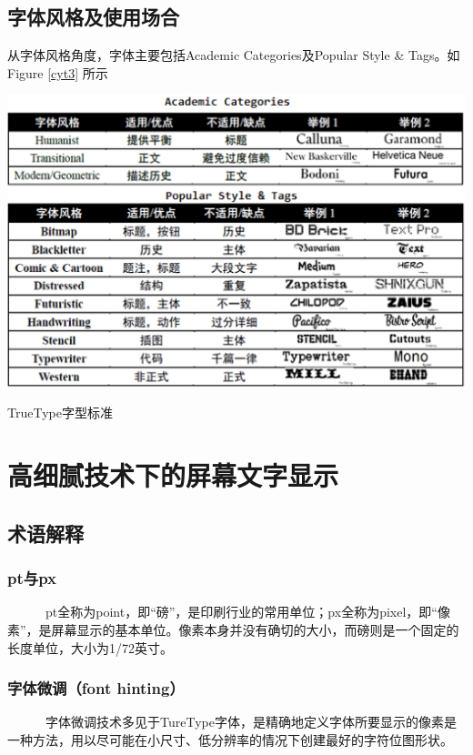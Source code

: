 \documentclass[a4paper]{article}
\begin{document}
\subsection{字体风格及使用场合}
从字体风格角度，字体主要包括Academic Categories及Popular Style \& Tags。如Figure \ref{cyt3}
所示

\makeatletter
\def\@captype{figure}
\makeatother
\centerline{\includegraphics [width=1\textwidth]{cyt3.png} }
\caption{TrueType字型标准}
\label{cyt3}


\section{高细腻技术下的屏幕文字显示}
\subsection{术语解释}
\subsubsection{pt与px}

~~~~~~pt全称为point，即“磅”，是印刷行业的常用单位；px全称为pixel，即“像素”，是屏幕显示的基本单位。像素本身并没有确切的大小，而磅则是一个固定的长度单位，大小为1/72英寸。

\subsubsection{字体微调（font hinting）}
~~~~~~字体微调技术多见于TureType字体\cite{mxw1}，是精确地定义字体所要显示的像素是一种方法，用以尽可能在小尺寸、低分辨率的情况下创建最好的字符位图形状。
\end{document}
